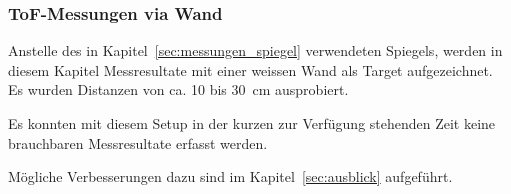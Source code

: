\subsubsection{ToF-Messungen via Wand}\label{sec:messungen_wand}

Anstelle des in Kapitel~\ref{sec:messungen_spiegel} verwendeten Spiegels, werden in diesem Kapitel Messresultate mit
einer weissen Wand als Target aufgezeichnet. Es wurden Distanzen von ca. 10 bis 30~cm ausprobiert.

Es konnten mit diesem Setup in der kurzen zur Verfügung stehenden Zeit keine brauchbaren Messresultate erfasst werden.

Mögliche Verbesserungen dazu sind im Kapitel~\ref{sec:ausblick} aufgeführt. %
